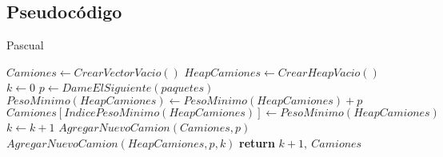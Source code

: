 \subsection{Pseudoc\'odigo}

\begin{algorithm}
\caption{Pascual}\label{pascual}
\begin{algorithmic}[1]
	\State $Camiones\gets CrearVectorVacio()$
	\State $HeapCamiones\gets CrearHeapVacio()$
	\State $k\gets 0$
		\State $p\gets DameElSiguiente(paquetes)$
			\State $PesoMinimo(HeapCamiones)\gets PesoMinimo(HeapCamiones)+p$
			\State $Camiones[IndicePesoMinimo(HeapCamiones)]\gets PesoMinimo(HeapCamiones)$\\
		\Else
			\State $k\gets k+1$
			\State $AgregarNuevoCamion(Camiones, p)$
			\State $AgregarNuevoCamion(HeapCamiones, p, k)$
		\EndIf
	\EndWhile\label{pascual}
\State \textbf{return} $k+1,\ Camiones$
\EndProcedure
\end{algorithmic}
\end{algorithm}
